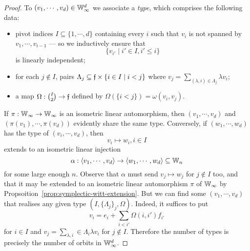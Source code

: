 \begin{proof}
    To $(v_1, \cdots, v_d) \in \mathbb{W}_\infty^d$ we associate a \emph{type}, 
    which comprises the following data:
    \begin{itemize}
        \item 
        pivot indices $I \subseteq \{1, \cdots, d\}$ containing every $i$ 
        such that $v_i$ is not spanned by $v_1, \cdots, v_{i-1}$
        --- so we inductively ensure that $$\{v_{i'} \mid i' \in I, i' \leq i\}$$ is linearly independent;

        \item 
        for each $j \not\in I$, pairs $\Lambda_j \subseteq \mathfrak{f} \times \{i \in I \mid i < j\}$
        where $v_j = \sum_{(\lambda, i) \in \Lambda_j} \lambda v_i$;

        \item 
        a map $\Omega : \binom{I}{2} \to \mathfrak{f}$ defined by $\Omega(\{i < j\}) = \omega(v_i, v_j)$.
    \end{itemize}
    If $\pi : \mathbb{W}_\infty \to \mathbb{W}_\infty$ is an isometric linear automorphism,
    then $(v_1, \cdots, v_d)$ and $(\pi(v_1), \cdots, \pi(v_d))$ evidently share the same type.
    Conversely, if $(w_1, \cdots, w_d)$ has the type of $(v_i, \cdots, v_d)$,
    then \[
        v_i \mapsto w_i, i \in I
    \] extends to an isometric linear injection 
    \[
        \alpha : \langle v_1, \cdots, v_d \rangle 
        \to \langle w_1, \cdots, w_d \rangle 
        \subseteq \mathbb{W}_n
    \]
    for some large enough $n$.
    Observe that $\alpha$ must send $v_j \mapsto w_j$ for $j \not\in I$ too,
    and that it may be extended to an isometric linear automorphism $\pi$ of $\mathbb{W}_\infty$ by Propsoition~\ref{prop:symplectic-witt-extension}.
    But we can find some $(v_1, \cdots, v_d)$ that realises any given type $(I, \{\Lambda_j\}_j, \Omega)$.
    Indeed, it suffices to put
    \[
        v_i = e_i + \sum_{i < i'} \Omega(i, i') f_{i'}
    \]
    for $i \in I$ and $v_j = \sum_{\lambda, i} \in \Lambda_i \lambda v_i$ for $j \not\in I$.
    Therefore the number of types is precisely the number of orbits in $\mathbb{W}_\infty^d$.


\end{proof}
